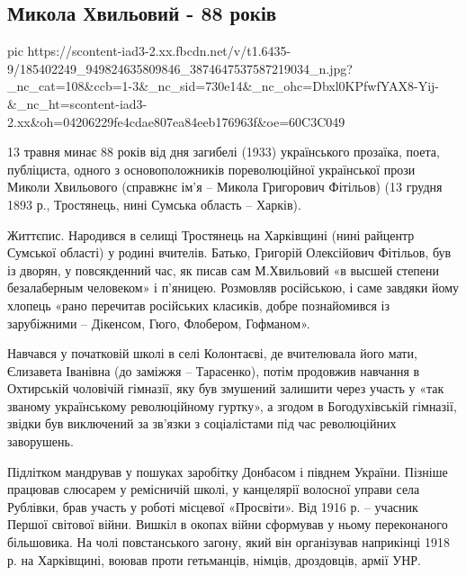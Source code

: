  
 
 
 
 

\subsection{Микола Хвильовий - 88 років}


\ifcmt
  pic https://scontent-iad3-2.xx.fbcdn.net/v/t1.6435-9/185402249_949824635809846_3874647537587219034_n.jpg?_nc_cat=108&ccb=1-3&_nc_sid=730e14&_nc_ohc=Dbxl0KPfwfYAX8-Yij-&_nc_ht=scontent-iad3-2.xx&oh=04206229fe4cdae807ea84eeb176963f&oe=60C3C049
\fi


13 травня минає 88 років від дня загибелі (1933) українського прозаїка, поета,
публіциста, одного з основоположників пореволюційної української прози Миколи
Хвильового (справжнє ім'я – Микола Григорович Фітільов) (13 грудня 1893 р.,
Тростянець, нині Сумська область – Харків).

Життєпис. Народився в селищі Тростянець на Харківщині (нині райцентр Сумської
області) у родині вчителів. Батько, Григорій Олексійович Фітільов, був із
дворян, у повсякденний час, як писав сам М.Хвильовий «в высшей степени
безалаберным человеком» і п'яницею. Розмовляв російською, і саме завдяки йому
хлопець «рано перечитав російських класиків, добре познайомився із зарубіжними
– Дікенсом, Гюго, Флобером, Гофманом».

Навчався у початковій школі в селі Колонтаєві, де вчителювала його мати,
Єлизавета Іванівна (до заміжжя – Тарасенко), потім продовжив навчання в
Охтирській чоловічій гімназії, яку був змушений залишити через участь у «так
званому українському революційному гуртку», а згодом в Богодухівській гімназії,
звідки був виключений за зв'язки з соціалістами під час революційних
заворушень.

Підлітком мандрував у пошуках заробітку Донбасом і півднем України. Пізніше
працював слюсарем у ремісничій школі, у канцелярії волосної управи села
Рублівки, брав участь у роботі місцевої «Просвіти». Від 1916 р. – учасник
Першої світової війни. Вишкіл в окопах війни сформував у ньому переконаного
більшовика. На чолі повстанського загону, який він організував наприкінці 1918
р. на Харківщині, воював проти гетьманців, німців, дроздовців, армії УНР.

